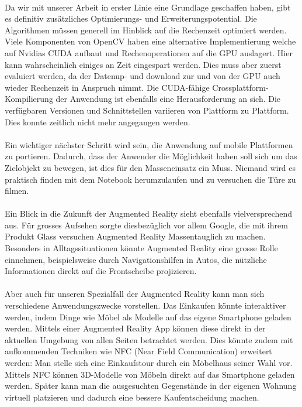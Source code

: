 \noindent\paragraph{}
Da wir mit unserer Arbeit in erster Linie eine Grundlage geschaffen haben, gibt es definitiv zusätzliches Optimierungs- und Erweiterungspotential. Die Algorithmen müssen generell im Hinblick auf die Rechenzeit optimiert werden. Viele Komponenten von OpenCV haben eine alternative Implementierung welche auf Nvidias CUDA aufbaut und Rechenoperationen auf die GPU auslagert. Hier kann wahrscheinlich einiges an Zeit eingespart werden. Dies muss aber zuerst evaluiert werden, da der Datenup- und download zur und von der GPU auch wieder Rechenzeit in Anspruch nimmt. Die CUDA-fähige Crossplattform-Kompilierung der Anwendung ist ebenfalls eine Herausforderung an sich. Die verfügbaren Versionen und Schnittstellen variieren von Plattform zu Plattform. Dies konnte zeitlich nicht mehr angegangen werden.
\noindent\paragraph{}
Ein wichtiger nächster Schritt wird sein, die Anwendung auf mobile Plattformen zu portieren. Dadurch, dass der Anwender die Möglichkeit haben soll sich um das Zielobjekt zu bewegen, ist dies für den Masseneinsatz ein Muss. Niemand wird es praktisch finden mit dem Notebook herumzulaufen und zu versuchen die Türe zu filmen.
\noindent\paragraph{}
Ein Blick in die Zukunft der Augmented Reality sieht ebenfalls vielversprechend aus. Für grosses Aufsehen sorgte diesbezüglich vor allem Google, die mit ihrem Produkt Glass versuchen Augmented Reality Massentauglich zu machen. Besonders in Alltagssituationen könnte Augmented Reality eine grosse Rolle einnehmen, beispielsweise durch Navigationshilfen in Autos, die nützliche Informationen direkt auf die Frontscheibe projizieren.
\noindent\paragraph{}
Aber auch für unseren Spezialfall der Augmented Reality kann man sich verschiedene Anwendungszwecke vorstellen. Das Einkaufen könnte interaktiver werden, indem Dinge wie Möbel als Modelle auf das eigene Smartphone geladen werden. Mittels einer Augmented Reality App können diese direkt in der aktuellen Umgebung von allen Seiten betrachtet werden. Dies könnte zudem mit aufkommenden Techniken wie NFC (Near Field Communication) erweitert werden: Man stelle sich eine Einkaufstour durch ein Möbelhaus seiner Wahl vor. Mittels NFC können 3D-Modelle von Möbeln direkt auf das Smartphone geladen werden. Später kann man die ausgesuchten Gegenstände in der eigenen Wohnung virtuell platzieren und dadurch eine bessere Kaufentscheidung machen.
